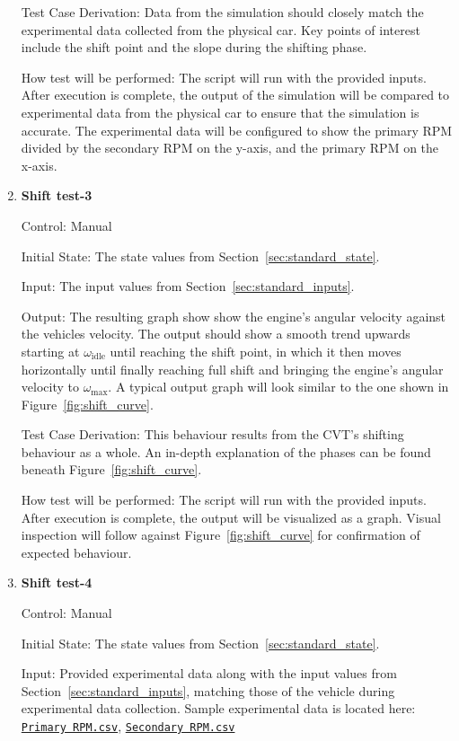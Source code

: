 \documentclass[12pt, titlepage]{article}
\newcommand{\refdata}[2]{
  \href{https://github.com/gr812b/CVT-Simulator/blob/main/experimental-data/#1
  }{\texttt{#2}}}
\begin{document}
\begin{enumerate}
  Test Case Derivation: Data from the simulation should closely match the experimental data collected from the physical car. Key points of interest include the shift point and the slope during the shifting phase.

  How test will be performed: The script will run with the provided inputs. After execution is complete, the output of the simulation will be compared to experimental data from the physical car to ensure that the simulation is accurate. The experimental data will be configured to show the primary RPM divided by the secondary RPM on the y-axis, and the primary RPM on the x-axis.
  
  \item {} \hypertarget{Shift test-3}{\textbf{Shift test-3}} \label{Shift test-3}
  
  Control: Manual
            
  Initial State: The state values from Section~\ref{sec:standard_state}.
  
  Input: The input values from Section~\ref{sec:standard_inputs}.
            
  Output: The resulting graph show show the engine's angular velocity against the vehicles velocity. The output should show a smooth trend upwards starting at $\omega_\text{idle}$ until reaching the shift point, in which it then moves horizontally until finally reaching full shift and bringing the engine's angular velocity to $\omega_\text{max}$. A typical output graph will look similar to the one shown in Figure~\ref{fig:shift_curve}.
  
  Test Case Derivation: This behaviour results from the CVT's shifting behaviour as a whole. An in-depth explanation of the phases can be found beneath Figure~\ref{fig:shift_curve}.
  
  How test will be performed: The script will run with the provided inputs. After execution is complete, the output will be visualized as a graph. Visual inspection will follow against Figure~\ref{fig:shift_curve} for confirmation of expected behaviour.
  
  \item {} \hypertarget{Shift test-4}{\textbf{Shift test-4}} \label{Shift test-4}

  Control: Manual

  Initial State: The state values from Section~\ref{sec:standard_state}.

  Input: Provided experimental data along with the input values from Section~\ref{sec:standard_inputs}, matching those of the vehicle during experimental data collection. Sample experimental data is located here: \refdata{RPM\%20PRIM.csv}{Primary RPM.csv}, \refdata{RPM\%20SEC.csv}{Secondary RPM.csv}


\end{enumerate}
\end{document}
